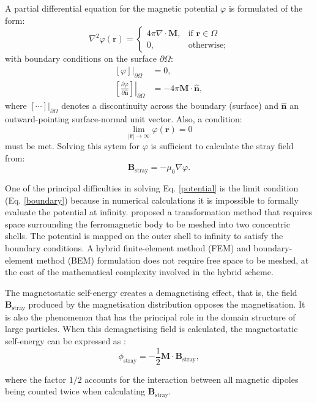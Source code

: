 A partial differential equation for the magnetic potential $\varphi$ is formulated of the form:
\begin{equation}\label{potential}
\nabla^2 \varphi(\boldsymbol{r}) =
\begin{cases}
4\pi\nabla \cdot \boldsymbol{M}, & \text{if }\boldsymbol{r} \in \Omega \\
0,                           & \text{otherwise;}
\end{cases}
\end{equation}
with boundary conditions on the surface $\partial \Omega$:
\begin{align}
\left. \left[ \varphi \right]\right|_{\partial \Omega} &= 0, \\
\left. \left[ \frac{\partial \varphi}{\partial \boldsymbol{\hat{n}}} \right]\right|_{\partial \Omega} &= -4\pi \boldsymbol{M} \cdot \boldsymbol{\hat{n}},
\end{align}
where $\left. \left[\cdots \right]\right|_{\partial \Omega}$ denotes a discontinuity across the boundary (surface) and $\boldsymbol{\hat{n}}$ an outward-pointing surface-normal unit vector. Also, a condition:
\begin{equation}\label{boundary}
\lim_{|\boldsymbol{r}| \to \infty} \varphi(\boldsymbol{r}) = 0
\end{equation}
must be met. Solving this sytem for $\varphi$ is sufficient to calculate the stray field from:
\begin{equation}
\boldsymbol{B}_\text{stray} = -\mu_0 \nabla \varphi.
\end{equation}\par

One of the principal difficulties in solving Eq. \ref{potential} is the limit condition (Eq. \ref{boundary}) because in numerical calculations it is impossible to formally evaluate the potential at infinity. \citet{Imhoff1990} proposed a transformation method that requires space surrounding the ferromagnetic body to be meshed into two concentric shells. The potential is mapped on the outer shell to infinity to satisfy the boundary conditions. A hybrid finite-element method (FEM) and boundary-element method (BEM) formulation \citep{Fredkin1990} does not require free space to be meshed, at the cost of the mathematical complexity involved in the hybrid scheme.\par

The magnetostatic self-energy creates a demagnetising effect, that is, the field $\boldsymbol{B}_{\text{stray}}$ produced by the magnetisation distribution opposes the magnetisation. It is also the phenomenon that has the principal role in the domain structure of large particles. When this demagnetising field is calculated, the magnetostatic self-energy can be expressed as \citep{Brown}:
\begin{equation}
\phi_{\text{stray}} = -\frac{1}{2}\boldsymbol{M}\cdot\boldsymbol{B}_{\text{stray}},
\end{equation}\par
where the factor $1/2$ accounts for the interaction between all magnetic dipoles being counted twice when calculating $\boldsymbol{B}_\text{stray}$.\par

